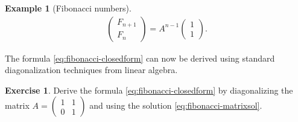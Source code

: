 \documentclass[11pt]{report}
\theoremstyle{plain}
\theoremstyle{definition}
\newtheorem{example}[thm]{Example}
\newtheorem{xexercise}[thm]{Exercise}
\begin{document}
\begin{example}[Fibonacci numbers]
\begin{equation*} \tag{34}\label{eq:fibonacci-matrixsol}
\begin{split}
\left(\begin{array}{c}
F_{n+1}\\F_n
\end{array}\right) = A^{n-1}
\left(\begin{array}{c}
1\\1
\end{array}\right).
\end{split}
\end{equation*}

\noindent The formula \eqref{eq:fibonacci-closedform} can now be
derived using standard diagonalization techniques from
linear algebra.
\end{example}

\begin{xexercise}
Derive the formula \eqref{eq:fibonacci-closedform} by
diagonalizing the matrix
$A=\left(\begin{array}{cc} 1&1\\0&1\end{array}\right)$
and using the solution \eqref{eq:fibonacci-matrixsol}.
\end{xexercise}
\end{document}

